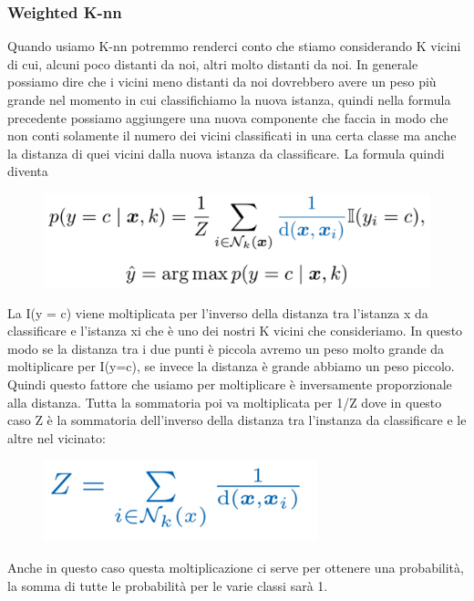 \documentclass[14pt]{extreport}
\begin{document}
\subsubsection{Weighted K-nn}
Quando usiamo K-nn potremmo renderci conto che stiamo considerando K vicini di cui, alcuni poco distanti da noi, altri molto distanti da noi. In
generale possiamo dire che i vicini meno distanti da noi dovrebbero avere un peso più grande nel momento in cui classifichiamo la nuova istanza,
quindi nella formula precedente possiamo aggiungere una nuova componente che faccia in modo che non conti solamente il numero dei vicini classificati
in una certa classe ma anche la distanza di quei vicini dalla nuova istanza da classificare. La formula quindi diventa


\begin{figure}[H]
	\centering
	\includegraphics[width=0.7\linewidth]{451.jpeg}
\end{figure}

La I(y = c) viene moltiplicata per l’inverso della distanza tra l’istanza x da classificare e l’istanza xi che è uno dei nostri K vicini che
consideriamo. In questo modo se la distanza tra i due punti è piccola avremo un peso molto grande da moltiplicare per I(y=c), se invece la distanza è
grande abbiamo un peso piccolo. Quindi questo fattore che usiamo per moltiplicare è inversamente proporzionale alla distanza. Tutta la sommatoria poi
va moltiplicata per 1/Z dove in questo caso Z è la sommatoria dell’inverso della distanza tra l’instanza da classificare e le altre nel vicinato:


\begin{figure}[H]
	\centering
	\includegraphics[width=0.7\linewidth]{452.jpeg}
\end{figure}

Anche in questo caso questa moltiplicazione ci serve per ottenere una probabilità, la somma di tutte le probabilità per le varie classi sarà 1.
\end{document}
